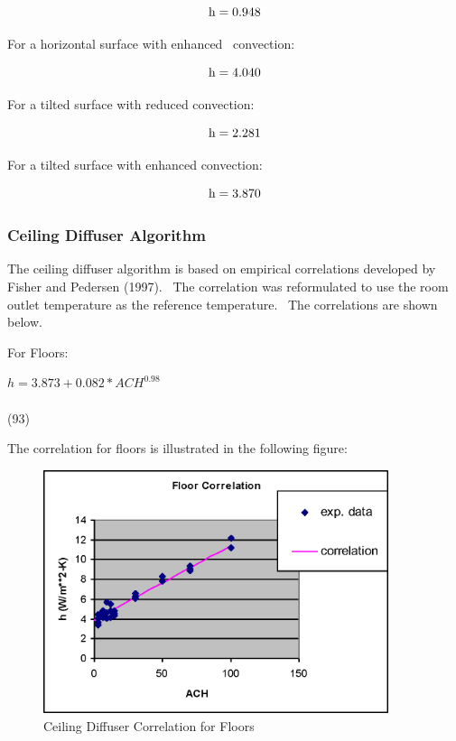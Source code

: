 \begin{equation}
{\rm{h  =  0}}{\rm{.948}}
\end{equation}

For a horizontal surface with enhanced~ convection:

\begin{equation}
{\rm{h  =  4}}{\rm{.040}}
\end{equation}

For a tilted surface with reduced convection:

\begin{equation}
{\rm{h  =  2}}{\rm{.281}}
\end{equation}

For a tilted surface with enhanced convection:

\begin{equation}
{\rm{h  =  3}}{\rm{.870}}
\end{equation}

\subsubsection{Ceiling Diffuser Algorithm}\label{ceiling-diffuser-algorithm}

The ceiling diffuser algorithm is based on empirical correlations developed by Fisher and Pedersen (1997).~ The correlation was reformulated to use the room outlet temperature as the reference temperature.~ The correlations are shown below.

For Floors:

\(h = 3.873 + 0.082 * AC{H^{0.98}}\) ~~~~~~~~~~~~~~~~~~~~~~~~~~~~~~~~~~~~~~~~~~~~~~~~~~~~~~~~~~~~~~~~~~~~~ (93)

The correlation for floors is illustrated in the following figure:

\begin{figure}[hbtp] %
\centering
\includegraphics[width=0.9\textwidth, height=0.9\textheight, keepaspectratio=true]{media/image378.png}
\caption{Ceiling Diffuser Correlation for Floors \protect \label{fig:ceiling-diffuser-correlation-for-floors}}
\end{figure}

